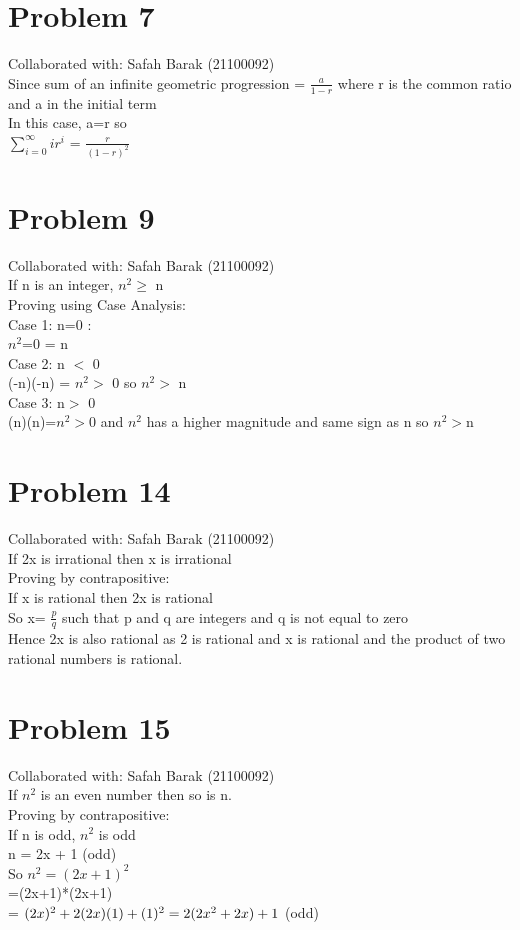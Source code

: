 \documentclass{article}
\begin{document}
\section{Problem 7}
Collaborated with: Safah Barak (21100092)\\
Since sum of an infinite geometric progression = $\frac {a}{1-r}$ where r is the common ratio and a in the initial term\\ In this case, a=r so \\
 $\sum\limits_{i=0}^{\infty} ir^i$ = $\frac{r}{(1-r)^{2}}$

\section{Problem 9}
Collaborated with: Safah Barak (21100092)\\
If n is an integer, $n^{2} \geq$ n \\Proving using Case Analysis: \\ Case 1: n=0 : \\ $n^{2}$=0 = n \\ Case 2: n $<$ 0 \\ (-n)(-n) = $n^{2} > $ 0 so $n^{2} >$ n\\ Case 3: n$>$ 0\\ (n)(n)=$n^{2} >$0 and $n^{2}$ has a higher magnitude and same sign as n so $n^{2} >$n


\section{Problem 14}
Collaborated with:  Safah Barak (21100092)\\
If 2x is irrational then x is irrational\\ Proving by contrapositive: \\If x is rational then 2x is rational \\ So x= $\frac{p}{q}$ such that p and q are integers and q is not equal to zero \\  Hence 2x is also rational as 2 is rational and x is rational and the product of two rational numbers is rational.  

\section{Problem 15}
Collaborated with: Safah Barak (21100092) \\
If $n^{2}$ is an even number then so is n. \\ Proving by contrapositive: \\ If n is odd, $n^{2}$ is odd \\ n = 2x + 1 (odd)\\ So $n^{2} =(2x+1)^{2}$ \\ =(2x+1)*(2x+1) \\= $(2x)^{2} + 2(2x)(1) +(1)^{2}  \\= 2(2x^{2} +2x) +1$ (odd)
\end{document}
